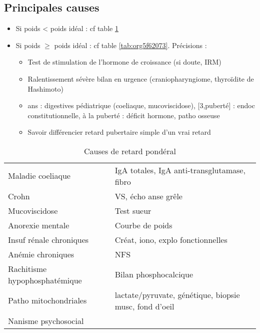 \documentclass[11pt]{article}
\begin{document}
\subsection{Principales causes}
\label{sec:orgbf3202b}
\begin{itemize}
\item Si poids < poids idéal : cf table \ref{tab:org1fe21a6}
\item Si poids \(\ge\) poids idéal : cf table \ref{tab:org5f62073}. Précisions :
\begin{itemize}
\item Test de stimulation de l'hormone de croissance (\danger si doute, IRM)
\item Ralentissement sévère \thus bilan en urgence (craniopharyngiome, thyroïdite de
Hashimoto) \skull
\item\relax [0, 3] ans : digestives pédiatrique (coeliaque, mucoviscidose), [3,puberté] :
endoc constitutionnelle, à la puberté : déficit hormone, patho osseuse
\item Savoir différencier retard pubertaire simple d'un vrai retard
\end{itemize}
\end{itemize}

\begin{table}[htbp]
\caption{\label{tab:org1fe21a6}
Causes de retard pondéral}
\centering
\begin{tabular}{ll}
\toprule
Maladie coeliaque & IgA totales, IgA anti-transglutamase, fibro\\
Crohn & VS, écho anse grêle\\
Mucoviscidose & Test sueur\\
Anorexie mentale & Courbe de poids\\
Insuf rénale chroniques & Créat, iono, explo fonctionnelles\\
Anémie chroniques & NFS\\
Rachitisme hypophosphatémique & Bilan phosphocalcique\\
Patho mitochondriales & lactate/pyruvate, génétique, biopsie musc, fond d'oeil\\
Nanisme psychosocial & \\
\bottomrule
\end{tabular}
\end{table}
\end{document}
